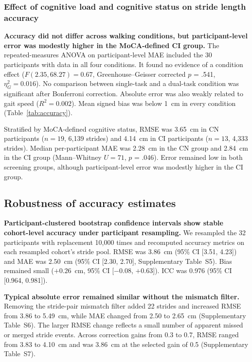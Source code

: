 \documentclass[fleqn,10pt,lineno]{wlpeerj}
\begin{document}
\FloatBarrier
\subsubsection{Effect of cognitive load and cognitive status on stride length accuracy}

\textbf{Accuracy did not differ across walking conditions, but participant-level error was modestly higher in the MoCA-defined CI group.}
The repeated-measures ANOVA on participant-level MAE included the 30 participants with data in all four conditions. It found no evidence of a condition effect ($F(2.35, 68.27) = 0.67$, Greenhouse--Geisser corrected $p$ = .541, $\eta^2_G = 0.016$). No comparison between single-task and a dual-task condition was significant after Bonferroni correction. Absolute error was also weakly related to gait speed ($R^2 = 0.002$). Mean signed bias was below 1~cm in every condition (Table~\ref{tab:accuracy}).

Stratified by MoCA-defined cognitive status, RMSE was 3.65~cm in CN participants ($n = 19$, 6{,}139 strides) and 4.14~cm in CI participants ($n = 13$, 4{,}333 strides). Median per-participant MAE was 2.28~cm in the CN group and 2.84~cm in the CI group (Mann--Whitney $U = 71$, $p$ = .046). Error remained low in both screening groups, although participant-level error was modestly higher in the CI group.

\subsection{Robustness of accuracy estimates}\label{sec:robustness}

\textbf{Participant-clustered bootstrap confidence intervals show stable cohort-level accuracy under participant resampling.}
We resampled the 32 participants with replacement 10{,}000 times and recomputed accuracy metrics on each resampled cohort's stride pool. RMSE was 3.86~cm (95\% CI [3.51, 4.23]) and MAE was 2.50~cm (95\% CI [2.30, 2.70], Supplementary Table~S5). Bias remained small ($+0.26$~cm, 95\% CI [$-0.08$, $+0.63$]). ICC was 0.976 (95\% CI [0.964, 0.981]).

\textbf{Typical absolute error remained similar without the mismatch filter.} Removing the stride-pair mismatch filter added 22 strides and increased RMSE from 3.86 to 5.49~cm, while MAE changed from 2.50 to 2.65~cm (Supplementary Table~S6). The larger RMSE change reflects a small number of apparent missed or merged stride events. Across correction gains from 0.3 to 0.7, RMSE ranged from 3.83 to 4.10~cm and was 3.86~cm at the selected gain of 0.5 (Supplementary Table~S7).
\end{document}

